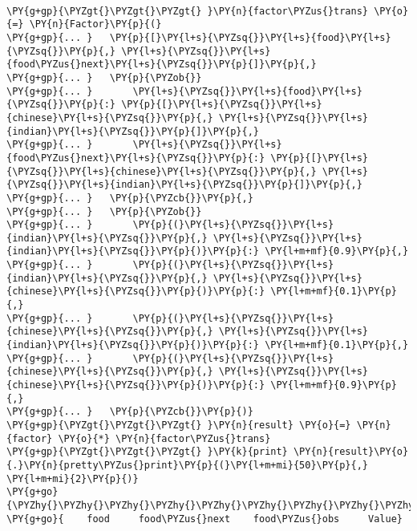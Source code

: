 \begin{example}
\begin{Verbatim}[commandchars=\\\{\}]

\PY{g+gp}{\PYZgt{}\PYZgt{}\PYZgt{} }\PY{n}{factor\PYZus{}trans} \PY{o}{=} \PY{n}{Factor}\PY{p}{(}
\PY{g+gp}{... }   \PY{p}{[}\PY{l+s}{\PYZsq{}}\PY{l+s}{food}\PY{l+s}{\PYZsq{}}\PY{p}{,} \PY{l+s}{\PYZsq{}}\PY{l+s}{food\PYZus{}next}\PY{l+s}{\PYZsq{}}\PY{p}{]}\PY{p}{,}
\PY{g+gp}{... }   \PY{p}{\PYZob{}}
\PY{g+gp}{... }       \PY{l+s}{\PYZsq{}}\PY{l+s}{food}\PY{l+s}{\PYZsq{}}\PY{p}{:} \PY{p}{[}\PY{l+s}{\PYZsq{}}\PY{l+s}{chinese}\PY{l+s}{\PYZsq{}}\PY{p}{,} \PY{l+s}{\PYZsq{}}\PY{l+s}{indian}\PY{l+s}{\PYZsq{}}\PY{p}{]}\PY{p}{,}
\PY{g+gp}{... }       \PY{l+s}{\PYZsq{}}\PY{l+s}{food\PYZus{}next}\PY{l+s}{\PYZsq{}}\PY{p}{:} \PY{p}{[}\PY{l+s}{\PYZsq{}}\PY{l+s}{chinese}\PY{l+s}{\PYZsq{}}\PY{p}{,} \PY{l+s}{\PYZsq{}}\PY{l+s}{indian}\PY{l+s}{\PYZsq{}}\PY{p}{]}\PY{p}{,}
\PY{g+gp}{... }   \PY{p}{\PYZcb{}}\PY{p}{,}
\PY{g+gp}{... }   \PY{p}{\PYZob{}}
\PY{g+gp}{... }       \PY{p}{(}\PY{l+s}{\PYZsq{}}\PY{l+s}{indian}\PY{l+s}{\PYZsq{}}\PY{p}{,} \PY{l+s}{\PYZsq{}}\PY{l+s}{indian}\PY{l+s}{\PYZsq{}}\PY{p}{)}\PY{p}{:} \PY{l+m+mf}{0.9}\PY{p}{,}
\PY{g+gp}{... }       \PY{p}{(}\PY{l+s}{\PYZsq{}}\PY{l+s}{indian}\PY{l+s}{\PYZsq{}}\PY{p}{,} \PY{l+s}{\PYZsq{}}\PY{l+s}{chinese}\PY{l+s}{\PYZsq{}}\PY{p}{)}\PY{p}{:} \PY{l+m+mf}{0.1}\PY{p}{,}
\PY{g+gp}{... }       \PY{p}{(}\PY{l+s}{\PYZsq{}}\PY{l+s}{chinese}\PY{l+s}{\PYZsq{}}\PY{p}{,} \PY{l+s}{\PYZsq{}}\PY{l+s}{indian}\PY{l+s}{\PYZsq{}}\PY{p}{)}\PY{p}{:} \PY{l+m+mf}{0.1}\PY{p}{,}
\PY{g+gp}{... }       \PY{p}{(}\PY{l+s}{\PYZsq{}}\PY{l+s}{chinese}\PY{l+s}{\PYZsq{}}\PY{p}{,} \PY{l+s}{\PYZsq{}}\PY{l+s}{chinese}\PY{l+s}{\PYZsq{}}\PY{p}{)}\PY{p}{:} \PY{l+m+mf}{0.9}\PY{p}{,}
\PY{g+gp}{... }   \PY{p}{\PYZcb{}}\PY{p}{)}
\PY{g+gp}{\PYZgt{}\PYZgt{}\PYZgt{} }\PY{n}{result} \PY{o}{=} \PY{n}{factor} \PY{o}{*} \PY{n}{factor\PYZus{}trans}
\PY{g+gp}{\PYZgt{}\PYZgt{}\PYZgt{} }\PY{k}{print} \PY{n}{result}\PY{o}{.}\PY{n}{pretty\PYZus{}print}\PY{p}{(}\PY{l+m+mi}{50}\PY{p}{,} \PY{l+m+mi}{2}\PY{p}{)}
\PY{g+go}{\PYZhy{}\PYZhy{}\PYZhy{}\PYZhy{}\PYZhy{}\PYZhy{}\PYZhy{}\PYZhy{}\PYZhy{}\PYZhy{}\PYZhy{}\PYZhy{}\PYZhy{}\PYZhy{}\PYZhy{}\PYZhy{}\PYZhy{}\PYZhy{}\PYZhy{}\PYZhy{}\PYZhy{}\PYZhy{}\PYZhy{}\PYZhy{}\PYZhy{}\PYZhy{}\PYZhy{}\PYZhy{}\PYZhy{}\PYZhy{}\PYZhy{}\PYZhy{}\PYZhy{}\PYZhy{}\PYZhy{}\PYZhy{}\PYZhy{}\PYZhy{}\PYZhy{}\PYZhy{}\PYZhy{}\PYZhy{}\PYZhy{}\PYZhy{}\PYZhy{}\PYZhy{}\PYZhy{}\PYZhy{}\PYZhy{}\PYZhy{}}
\PY{g+go}{    food     food\PYZus{}next    food\PYZus{}obs     Value}

\end{Verbatim}
\end{example}
